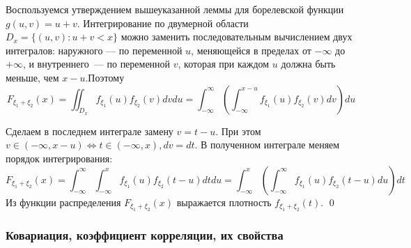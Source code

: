 \documentclass[oneside,final,14pt]{extreport}
\renewenvironment{proof}{{\bfseries Доказательство.}}{\qed}
\theoremstyle{plain}
\theoremstyle{definition}
\theoremstyle{named}
\begin{document}
\begin{proof}
    Воспользуемся утверждением вышеуказанной леммы для борелевской функции $g(u, v)=u+v$. Интегрирование по двумерной области $D_{x}=\{(u, v) : u+v<x\}$ можно заменить последовательным вычислением двух интегралов: наружного — по переменной $u$, меняющейся в пределах от $-\infty$ до $+\infty$, и внутреннего~--- по переменной $v$, которая при каждом $u$ должна быть меньше, чем $x-u$.Поэтому
    \begin{equation*}
        F_{\xi_{1}+\xi_{2}}(x)=\iint_{D_{x}} f_{\xi_{1}}(u) f_{\xi_{2}}(v) d v d u=\int_{-\infty}^{\infty}\left(\int_{-\infty}^{x-u} f_{\xi_{1}}(u) f_{\xi_{2}}(v) d v\right) d u
    \end{equation*}
    
    Сделаем в последнем интеграле замену $v=t-u$. При этом $v \in(-\infty, x-u) \Leftrightarrow t \in(-\infty, x), d v=d t$. В полученном интеграле меняем порядок интегрирования:
    \begin{equation*}
        F_{\xi_{1}+\xi_{2}}(x)=\int_{-\infty}^{\infty} \int_{-\infty}^{x} f_{\xi_{1}}(u) f_{\xi_{2}}(t-u) d t d u=\int_{-\infty}^{x}\left(\int_{-\infty}^{\infty} f_{\xi_{1}}(u) f_{\xi_{2}}(t-u) d u\right) d t
    \end{equation*}
    Из функции распределения $F_{\xi_{1}+\xi_{2}}(x)$ выражается плотность $f_{\xi_{1}+\xi_{2}}(t)$.
\end{proof}

\subsubsection{Ковариация, коэффициент корреляции, их свойства}
\end{document}
